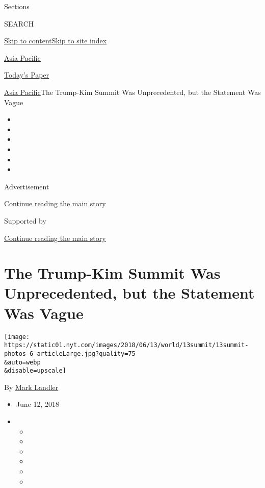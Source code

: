 Sections

SEARCH

\protect\hyperlink{site-content}{Skip to
content}\protect\hyperlink{site-index}{Skip to site index}

\href{https://www.nytimes.com/section/world/asia}{Asia Pacific}

\href{https://myaccount.nytimes.com/auth/login?response_type=cookie\&client_id=vi}{}

\href{https://www.nytimes.com/section/todayspaper}{Today's Paper}

\href{/section/world/asia}{Asia Pacific}\textbar{}The Trump-Kim Summit
Was Unprecedented, but the Statement Was Vague

\begin{itemize}
\item
\item
\item
\item
\item
\item
\end{itemize}

Advertisement

\protect\hyperlink{after-top}{Continue reading the main story}

Supported by

\protect\hyperlink{after-sponsor}{Continue reading the main story}

\hypertarget{the-trump-kim-summit-was-unprecedented-but-the-statement-was-vague}{%
\section{The Trump-Kim Summit Was Unprecedented, but the Statement Was
Vague}\label{the-trump-kim-summit-was-unprecedented-but-the-statement-was-vague}}

\texttt{[image: https://static01.nyt.com/images/2018/06/13/world/13summit/13summit-photos-6-articleLarge.jpg?quality=75\\\&auto=webp\\\&disable=upscale]}

By \href{http://www.nytimes.com/by/mark-landler}{Mark Landler}

\begin{itemize}
\item
  June 12, 2018
\item
  \begin{itemize}
  \item
  \item
  \item
  \item
  \item
  \item
  \end{itemize}
\end{itemize}

